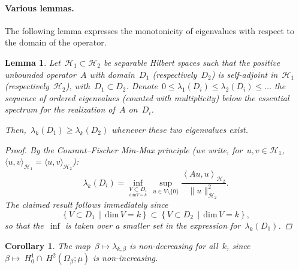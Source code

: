 \documentclass[10pt]{article}
\newcommand{\1}{\mathbbm 1}
\newtheorem{lemma}{Lemma}
\newtheorem{corollary}{Corollary}
\begin{document}
    \paragraph{Various lemmas.\newline}
    The following lemma expresses the monotonicity of eigenvalues with respect to the domain of the operator.
    \begin{lemma}
        \label{lemma:cf_monotonicity}
        Let~$\mathcal H_1 \subset \mathcal H_2$ be separable Hilbert spaces such that the positive unbounded operator~$A$ with domain~$D_1$ (respectively~$D_2$) is self-adjoint in~$\mathcal H_1$ (respectively~$\mathcal H_2$), with~$D_1\subset D_2$.
        Denote~$0 \leq \lambda_1(D_i) \leq \lambda_2(D_i)\leq \dots$ the sequence of ordered eigenvalues (counted with multiplicity) below the essential spectrum for the realization of~$A$ on~$D_i$.

        Then,~$\lambda_k(D_1) \geq \lambda_k(D_2)$ whenever these two eigenvalues exist.

        \begin{proof}
        By the Courant--Fischer Min-Max principle (we write, for~$u,v \in \mathcal H_1$,~$\langle u,v\rangle_{\mathcal H_1} = \langle u,v\rangle_{\mathcal H_2}$):
       ~$$\lambda_k(D_i) = \underset{\underset{\mathrm{dim} V = k}{V\subset D_i}}{\inf}\,\underset{u\in V\setminus\{0\}}{\sup} \frac{\left\langle Au,u\right\rangle_{\mathcal H_2}}{\|u\|^2_{\mathcal H_2}}.$$
        The claimed result follows immediately since
       ~$$\left\{ V\subset D_1\,\middle|\,\mathrm{dim}\,V = k\right\} \subset \left\{ V\subset D_2\,\middle|\,\mathrm{dim}\,V = k\right\},$$
        so that the~$\inf$ is taken over a smaller set in the expression for~$\lambda_k(D_1)$.
        \end{proof}
    \end{lemma}
    \begin{corollary}
        The map~$\beta \mapsto \lambda_{k,\beta}$ is non-decreasing for all~$k$, since~$\beta\mapsto~H_0^1\cap~H^2(\Omega_\beta;\mu)$ is non-increasing.
    \end{corollary}
\end{document}
